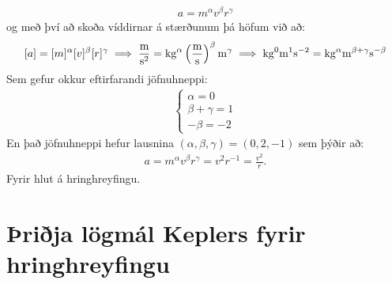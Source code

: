\ifdefined \wholebook \else\documentclass[oneside]{book}\usepackage{EdlBook}\graphicspath{{figures/}}
\begin{document}
\begin{align*}
    a = m^{\alpha}v^\beta r^\gamma
\end{align*}
og með því að skoða víddirnar á stærðunum þá höfum við að:
\begin{align*}
    \left[ a \right] = [m]^{\alpha}[v]^\beta [r]^\gamma \implies \si[per-mode=fraction]{\frac{m}{s^2}} = \si{kg}^\alpha \left(\si{\frac{m}{s}}\right)^\beta \si{m}^\gamma \implies \si{kg}^{0}\si{m}^1 \si{s}^{-2} = \si{kg}^\alpha \si{m}^{\beta + \gamma} \si{s}^{-\beta}
\end{align*}
Sem gefur okkur eftirfarandi jöfnuhneppi:
\begin{align*}
    \begin{cases}
    \alpha = 0 \\
    \beta + \gamma = 1 \\
    -\beta = -2
    \end{cases}
\end{align*}
En það jöfnuhneppi hefur lausnina $(\alpha, \beta, \gamma) = (0,2,-1)$ sem þýðir að:
\begin{align*}
    a = m^{\alpha}v^\beta r^\gamma = v^2r^{-1} = \frac{v^2}{r}.
\end{align*}
Fyrir hlut á hringhreyfingu.



\section{Þriðja lögmál Keplers fyrir hringhreyfingu}
\end{document}
